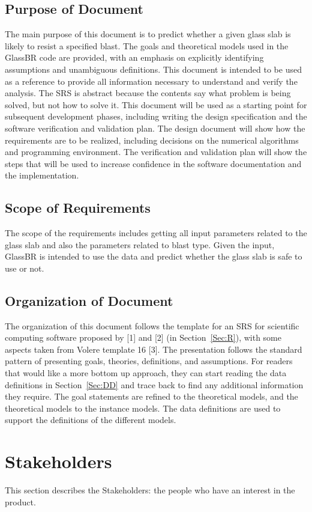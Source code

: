 \documentclass[12pt]{article}
\begin{document}
\subsection{Purpose of Document}
\label{Sec:PoD}
The main purpose of this document is to predict whether a given glass slab is likely to resist a specified blast. The goals and theoretical models used in the GlassBR code are provided, with an emphasis on explicitly identifying assumptions and unambiguous definitions. This document is intended to be used as a reference to provide all information necessary to understand and verify the analysis. The SRS is abstract because the contents say what problem is being solved, but not how to solve it.
This document will be used as a starting point for subsequent development phases, including writing the design specification and the software verification and validation plan. The design document will show how the requirements are to be realized, including decisions on the numerical algorithms and programming environment. The verification and validation plan will show the steps that will be used to increase confidence in the software documentation and the implementation.
\subsection{Scope of Requirements}
\label{Sec:SoR}
The scope of the requirements includes getting all input parameters related to the glass slab and also the parameters related to blast type. Given the input, GlassBR is intended to use the data and predict whether the glass slab is safe to use or not.
\subsection{Organization of Document}
\label{Sec:OoD}
The organization of this document follows the template for an SRS for scientific computing software proposed by [1] and [2] (in Section~\ref{Sec:R}), with some aspects taken from Volere template 16 [3]. The presentation follows the standard pattern of presenting goals, theories, definitions, and assumptions. For readers that would like a more bottom up approach, they can start reading the data definitions in Section~\ref{Sec:DD} and trace back to find any additional information they require.
The goal statements are refined to the theoretical models, and the theoretical models to the instance models. The data definitions are used to support the definitions of the different models.
\section{Stakeholders}
\label{Sec:S}
This section describes the Stakeholders: the people who have an interest in the product.
\end{document}
